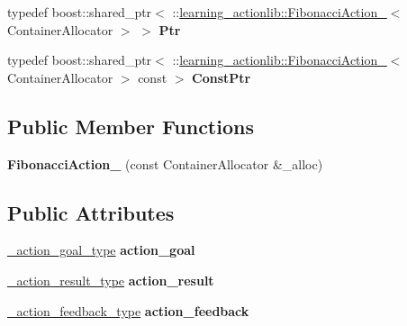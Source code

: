 \begin{DoxyCompactItemize}
typedef boost\+::shared\+\_\+ptr$<$ \+::\hyperlink{structlearning__actionlib_1_1FibonacciAction__}{learning\+\_\+actionlib\+::\+Fibonacci\+Action\+\_\+}$<$ Container\+Allocator $>$ $>$ {\bfseries Ptr}
\item 
\mbox{\label{structlearning__actionlib_1_1FibonacciAction___a909495af7c6d358486c973deba48d8e0}} 
typedef boost\+::shared\+\_\+ptr$<$ \+::\hyperlink{structlearning__actionlib_1_1FibonacciAction__}{learning\+\_\+actionlib\+::\+Fibonacci\+Action\+\_\+}$<$ Container\+Allocator $>$ const  $>$ {\bfseries Const\+Ptr}
\end{DoxyCompactItemize}
\subsection*{Public Member Functions}
\begin{DoxyCompactItemize}
\item 
\mbox{\label{structlearning__actionlib_1_1FibonacciAction___a900370fb09a3ff28903865409e6f2f27}} 
{\bfseries Fibonacci\+Action\+\_\+} (const Container\+Allocator \&\+\_\+alloc)
\end{DoxyCompactItemize}
\subsection*{Public Attributes}
\begin{DoxyCompactItemize}
\item 
\mbox{\label{structlearning__actionlib_1_1FibonacciAction___a24a981306ef71ea0b047c43aaa035d7f}} 
\hyperlink{structlearning__actionlib_1_1FibonacciActionGoal__}{\+\_\+action\+\_\+goal\+\_\+type} {\bfseries action\+\_\+goal}
\item 
\mbox{\label{structlearning__actionlib_1_1FibonacciAction___ad2add671d28e43aea9735ac72e5aae40}} 
\hyperlink{structlearning__actionlib_1_1FibonacciActionResult__}{\+\_\+action\+\_\+result\+\_\+type} {\bfseries action\+\_\+result}
\item 
\mbox{\label{structlearning__actionlib_1_1FibonacciAction___aa9948f0b68be786d1c79cf9e87182b6a}} 
\hyperlink{structlearning__actionlib_1_1FibonacciActionFeedback__}{\+\_\+action\+\_\+feedback\+\_\+type} {\bfseries action\+\_\+feedback}
\end{DoxyCompactItemize}


